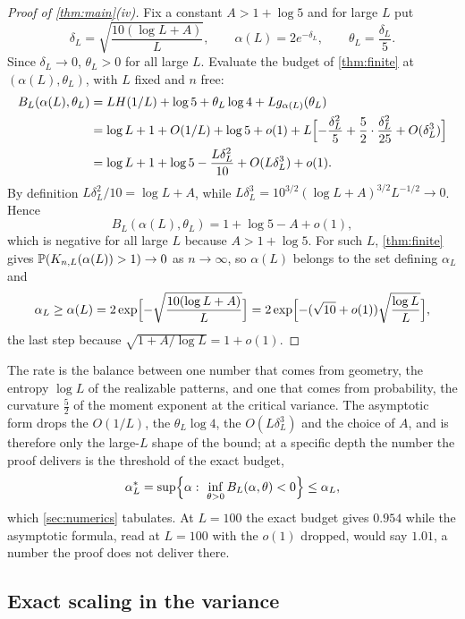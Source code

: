 \begin{proof}[Proof of \cref{thm:main}(iv)]
Fix a constant $A>1+\log5$ and for large $L$ put
\[
\delta_L=\sqrt{\frac{10(\log L+A)}L},\qquad\alpha(L)=2e^{-\delta_L},\qquad\theta_L=\frac{\delta_L}5 .
\]
Since $\delta_L\to0$, $\theta_L>0$ for all large $L$. Evaluate the budget of \cref{thm:finite} at $(\alpha(L),\theta_L)$, with $L$ fixed and $n$ free:
\begin{align*}
B_L(\alpha(L),\theta_L)&=LH(1/L)+\log5+\theta_L\log4+Lg_{\alpha(L)}(\theta_L)\\
&=\log L+1+O(1/L)+\log5+o(1)+L\Bigl[-\frac{\delta_L^2}5+\frac52\cdot\frac{\delta_L^2}{25}+O(\delta_L^3)\Bigr]\\
&=\log L+1+\log5-\frac{L\delta_L^2}{10}+O(L\delta_L^3)+o(1).
\end{align*}
By definition $L\delta_L^2/10=\log L+A$, while $L\delta_L^3=10^{3/2}(\log L+A)^{3/2}L^{-1/2}\to0$. Hence
\[
B_L(\alpha(L),\theta_L)=1+\log5-A+o(1),
\]
which is negative for all large $L$ because $A>1+\log5$. For such $L$, \cref{thm:finite} gives $\mathbb{P}(K_{n,L}(\alpha(L))>1)\to0$ as $n\to\infty$, so $\alpha(L)$ belongs to the set defining $\alpha_L$ and
\[
\alpha_L\ge\alpha(L)=2\exp\Bigl[-\sqrt{\frac{10(\log L+A)}L}\Bigr]=2\exp\Bigl[-(\sqrt{10}+o(1))\sqrt{\frac{\log L}L}\Bigr],
\]
the last step because $\sqrt{1+A/\log L}=1+o(1)$.
\end{proof}

The rate is the balance between one number that comes from geometry, the entropy $\log L$ of the realizable patterns, and one that comes from probability, the curvature $\tfrac52$ of the moment exponent at the critical variance. The asymptotic form drops the $O(1/L)$, the $\theta_L\log4$, the $O(L\delta^3_L)$ and the choice of $A$, and is therefore only the large-$L$ shape of the bound; at a specific depth the number the proof delivers is the threshold of the exact budget,
\begin{equation}\label{eq:alpha-star}
\alpha^*_L=\sup\Bigl\{\alpha:\ \inf_{\theta>0}B_L(\alpha,\theta)<0\Bigr\}\le\alpha_L,
\end{equation}
which \cref{sec:numerics} tabulates. At $L=100$ the exact budget gives $0.954$ while the asymptotic formula, read at $L=100$ with the $o(1)$ dropped, would say $1.01$, a number the proof does not deliver there.

\subsection{Exact scaling in the variance}

